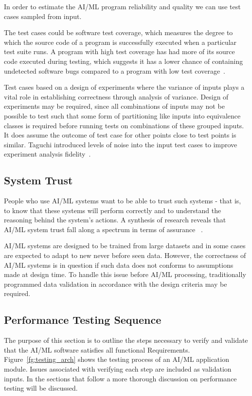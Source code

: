    
In order to estimate the AI/ML program reliability and quality we can use test cases sampled from input.  

The test cases could be software test coverage, which measures the degree to which the source code of a program is successfully executed when a particular test suite runs. A program with high test coverage has had more of its source code executed during testing, which suggests it has a lower chance of containing undetected software bugs compared to a program with low test coverage~\cite{hamill2004unit}. 

Test cases based on a design of experiments where the variance of inputs plays a vital role in establishing correctness through analysis of variance.  Design of experiments may be required, since all combinations of inputs may not be possible to test such that some form of partitioning like inputs into equivalence classes is required before running tests on combinations of these grouped inputs. It does assume the outcome of test case for other points close to test points is similar. Taguchi introduced levels of noise into the input test cases to improve experiment analysis fidelity~\cite{387375}.

\subsection{System Trust}
People who use AI/ML systems want to be able to trust such systems - that is, to know that these systems will perform correctly and to understand the reasoning behind the system's actions. A synthesis of research reveals that AI/ML system trust  fall along a spectrum in terms of assurance ~\cite{Israelsen:2019:XAY:3303862.3267338}. 

AI/ML systems are designed to be trained from large datasets and in some cases are expected to adapt to new never before seen data. However, the correctness of AI/ML systems is in question if such data does not conforms to assumptions made at design time. To handle this issue before AI/ML processing, traditionally programmed data validation in accordance with the design criteria may be required.


\subsection{Performance Testing Sequence}

The purpose of this section is to outline the steps necessary to verify and validate that the AI/ML software satisfies all functional Requirements. Figure~\ref{fg:testing_arch}  shows the testing process of an AI/ML application module. Issues associated with  verifying each step are included as validation inputs. In the sections that follow a more thorough discussion on performance testing will be discussed. 

